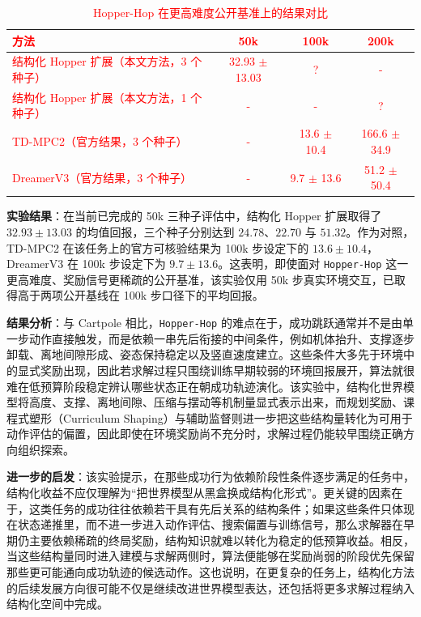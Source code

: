 \documentclass[UTF8]{ctexart}
\begin{document}
\begingroup
\makeatletter
\def\fnum@table{\textcolor{red}{表 \thetable}}
\makeatother
\begin{table}[ht]
\centering
\caption{\textcolor{red}{Hopper-Hop 在更高难度公开基准上的结果对比}}
\begin{tabular}{l c c c}
\toprule
\textcolor{red}{方法} & \textcolor{red}{50k} & \textcolor{red}{100k} & \textcolor{red}{200k} \\
\midrule
\textcolor{red}{结构化 Hopper 扩展（本文方法，3 个种子）} & \textcolor{red}{32.93 $\pm$ 13.03} & \textcolor{red}{?} & \textcolor{red}{-} \\
\textcolor{red}{结构化 Hopper 扩展（本文方法，1 个种子）} & \textcolor{red}{-} & \textcolor{red}{-} & \textcolor{red}{?} \\
\textcolor{red}{TD-MPC2（官方结果，3 个种子）} & \textcolor{red}{-} & \textcolor{red}{13.6 $\pm$ 10.4} & \textcolor{red}{166.6 $\pm$ 34.9} \\
\textcolor{red}{DreamerV3（官方结果，3 个种子）} & \textcolor{red}{-} & \textcolor{red}{9.7 $\pm$ 13.6} & \textcolor{red}{51.2 $\pm$ 50.4} \\
\bottomrule
\end{tabular}
\end{table}
\endgroup

{\color{red}
\textbf{实验结果}：在当前已完成的 50k 三种子评估中，结构化 Hopper 扩展取得了 \(32.93 \pm 13.03\) 的均值回报，三个种子分别达到 \(24.78\)、\(22.70\) 与 \(51.32\)。作为对照，TD-MPC2 在该任务上的官方可核验结果为 100k 步设定下的 \(13.6 \pm 10.4\)，DreamerV3 在 100k 步设定下为 \(9.7 \pm 13.6\)。这表明，即使面对 \texttt{Hopper-Hop} 这一更高难度、奖励信号更稀疏的公开基准，该实验仅用 50k 步真实环境交互，已取得高于两项公开基线在 100k 步口径下的平均回报。}

{\color{red}
\textbf{结果分析}：与 Cartpole 相比，\texttt{Hopper-Hop} 的难点在于，成功跳跃通常并不是由单一步动作直接触发，而是依赖一串先后衔接的中间条件，例如机体抬升、支撑逐步卸载、离地间隙形成、姿态保持稳定以及竖直速度建立。这些条件大多先于环境中的显式奖励出现，因此若求解过程只围绕训练早期较弱的环境回报展开，算法就很难在低预算阶段稳定辨认哪些状态正在朝成功轨迹演化。该实验中，结构化世界模型将高度、支撑、离地间隙、压缩与摆动等机制量显式表示出来，而规划奖励、课程式塑形（Curriculum Shaping）与辅助监督则进一步把这些结构量转化为可用于动作评估的偏置，因此即使在环境奖励尚不充分时，求解过程仍能较早围绕正确方向组织探索。}

{\color{red}
\textbf{进一步的启发}：该实验提示，在那些成功行为依赖阶段性条件逐步满足的任务中，结构化收益不应仅理解为“把世界模型从黑盒换成结构化形式”。更关键的因素在于，这类任务的成功往往依赖若干具有先后关系的结构条件；如果这些条件只体现在状态递推里，而不进一步进入动作评估、搜索偏置与训练信号，那么求解器在早期仍主要依赖稀疏的终局奖励，结构知识就难以转化为稳定的低预算收益。相反，当这些结构量同时进入建模与求解两侧时，算法便能够在奖励尚弱的阶段优先保留那些更可能通向成功轨迹的候选动作。这也说明，在更复杂的任务上，结构化方法的后续发展方向很可能不仅是继续改进世界模型表达，还包括将更多求解过程纳入结构化空间中完成。}
\end{document}
